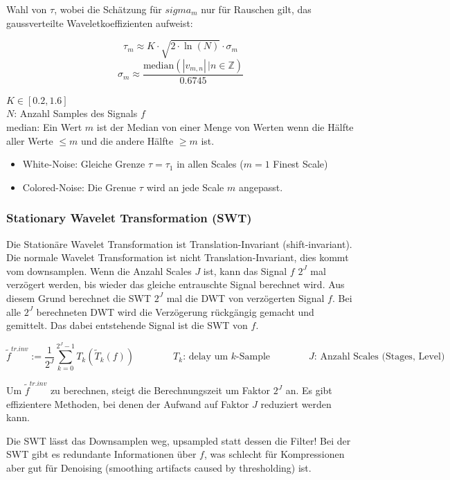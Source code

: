 Wahl von $\tau$, wobei die Schätzung für $sigma_m$ nur für Rauschen gilt, das gaussverteilte Waveletkoeffizienten aufweist:

\begin{minipage}[c]{0.5\textwidth}
\[
	\tau_m \approx K \cdot \sqrt{2 \cdot \ln(N)} \cdot \sigma_m  
\]
\[
	\sigma_m \approx \dfrac{\mathrm{median}(|v_{m,n}| \, | n \in  \mathbb{Z})}{0.6745} 
\]
\end{minipage}
\begin{minipage}[c]{0.5\textwidth}
$K \in [0.2,1.6]$\\
$N$: Anzahl Samples des Signals $f$\\
median: Ein Wert $m$ ist der Median von einer Menge von Werten wenn die Hälfte aller Werte $\leq m$ und die andere Hälfte $\geq m$ ist.
\end{minipage}

\begin{itemize}
	\item White-Noise: Gleiche Grenze $\tau = \tau_1$ in allen Scales ($m=1$ Finest Scale)
	\item Colored-Noise: Die Grenue $\tau$ wird an jede Scale $m$ angepasst.
\end{itemize}


\subsubsection{Stationary  Wavelet Transformation (SWT)}
Die Stationäre Wavelet Transformation ist Translation-Invariant (shift-invariant). Die normale Wavelet Transformation ist nicht Translation-Invariant, dies kommt vom downsamplen. Wenn die Anzahl Scales $J$ ist, kann das Signal $f$ $2^J$ mal verzögert werden, bis wieder das gleiche entrauschte Signal berechnet wird. Aus diesem Grund berechnet die SWT  $2^J$ mal die DWT von verzögerten Signal $f$. Bei alle $2^J$ berechneten DWT wird die Verzögerung rückgängig gemacht und gemittelt. Das dabei entstehende Signal ist die SWT von $f$. 

\[ 
	\tilde{f}^{tr.inv} := \dfrac{1}{2^J} \sum_{k=0}^{2^J-1}T_k \left( \tilde{T}_k(f) \right) 
	\qquad \qquad
	T_k \text{: delay um $k$-Sample} \qquad \qquad J\text{: Anzahl Scales (Stages, Level)}
\]

Um $\tilde{f}^{tr.inv}$ zu berechnen, steigt die Berechnungszeit um Faktor $2^J$ an. Es gibt effizientere Methoden, bei denen der Aufwand auf Faktor $J$ reduziert werden kann.

Die SWT lässt das Downsamplen weg, upsampled statt dessen die Filter! Bei der SWT gibt es redundante Informationen über $f$, was schlecht für Kompressionen aber gut für Denoising (smoothing artifacts caused by thresholding) ist.

